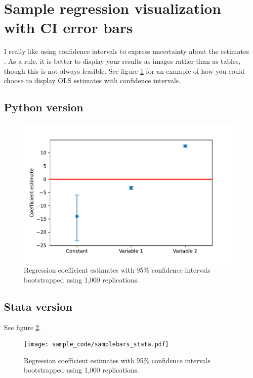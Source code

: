 \documentclass{article}
\begin{document}
\section{Sample regression visualization with CI error bars}
I really like using confidence intervals to express uncertainty about the estimates \citep[see e.g.,][]{zm2009}.  As a rule, it is better to display your results as images rather than as tables, though this is not always feasible. See figure \ref{fig:samplebars} for an example of how you could choose to display OLS estimates with confidence intervals.

\subsection{Python version}

\begin{figure}[ht]
    \centering
    \includegraphics[scale = 0.7]{samplebars.pdf}
    \caption{Regression coefficient estimates with 95\% confidence intervals bootstrapped using 1,000 replications.}
    \label{fig:samplebars}
\end{figure}

\subsection{Stata version}

See figure \ref{fig:samplebars_stata}.
\begin{figure}[hb]
    \centering
    \texttt{[image: sample\_code/samplebars\_stata.pdf]}
    \caption{Regression coefficient estimates with 95\% confidence intervals bootstrapped using 1,000 replications.}
    \label{fig:samplebars_stata}
\end{figure}
\end{document}
